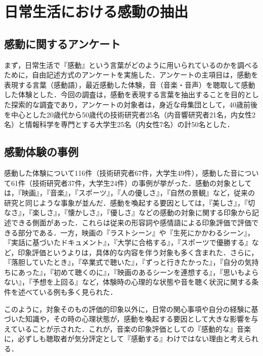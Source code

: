 \documentclass[japanese]{jnlp_1.3c}
\begin{document}
\section{日常生活における感動の抽出}

\subsection{感動に関するアンケート}

まず，日常生活で『感動』という言葉がどのように用いられているのかを調べるために，自由記述方式のアンケートを実施した．アンケートの主項目は，感動を表現する言葉（感動語），最近感動した体験，音（音楽・音声）を聴取して感動した体験とした．今回の調査は，感動を表現する言葉を抽出することを目的とした探索的な調査であり，アンケートの対象者は，身近な母集団として，40歳前後を中心とした20歳代から50歳代の技術研究者25名（内音響研究者21名，内女性2名）と情報科学を専門とする大学生25名（内女性7名）の計50名とした．



\subsection{感動体験の事例}

感動した体験について116件（技術研究者67件，大学生49件），感動した音について61件（技術研究者37件，大学生24件）の事例が挙がった．感動の対象としては，『映画』，『音楽』，『スポーツ』，『人の優しさ』，『自然の景観』など，従来の研究\cite{Web_401}\cite{Article_007}と同じような事象が並んだ．感動を喚起する要因としては，『美しさ』，『切なさ』，『楽しさ』，『懐かしさ』，『優しさ』などの感動の対象に関する印象から記述できる側面があった．これらは従来の形容詞や感情語による印象評価で評価できる部分である．一方，映画の『ラストシーン』や『生死にかかわるシーン』，『実話に基づいたドキュメント』，『大学に合格する』，『スポーツで優勝する』など，印象評価というよりは，具体的な内容を伴う対象も多く含まれた．さらに，『落胆していたとき』，『卒業式で聴いた』，『ずっと行きたかった』，『自分の気持ちにあった』，『初めて聴くのに』，『映画のあるシーンを連想する』，『思いもよらない』，『予想を上回る』など，体験時の心理的な状態や音を聴く状況に関する条件を述べている例も多く見られた．


このように，対象そのもの評価的印象以外に，日常の関心事項や自分の経験に基づいた知識や，その時の心理状態が，感動を喚起する要因として大きな影響を与えていることが示された．これが，音楽の印象評価としての『感動的な』音楽に，必ずしも聴取者が気分評定として『感動する』わけではない\cite{Inproc_201}理由と考えられる．
\end{document}
